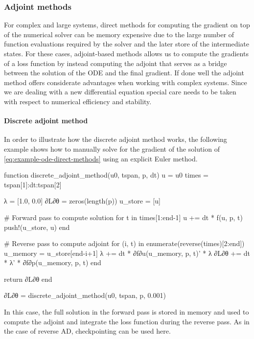 \subsubsection{Adjoint methods}
\label{section:computing-adjoints}

For complex and large systems, direct methods for computing the gradient on top of the numerical solver can be memory expensive due to the large number of function evaluations required by the solver and the later store of the intermediate states. 
For these cases, adjoint-based methods allows us to compute the gradients of a loss function by instead computing the adjoint that serves as a bridge between the solution of the ODE and the final gradient. 
If done well the adjoint method offers considerate advantages when working with complex systems.
Since we are dealing with a new differential equation special care needs to be taken with respect to numerical efficiency and stability.

\paragraph{Discrete adjoint method}

In order to illustrate how the discrete adjoint method works, the following example shows how to manually solve for the gradient of the solution of \eqref{eq:example-ode-direct-methods} using an explicit Euler method. 
\begin{jllisting}
function discrete_adjoint_method(u0, tspan, p, dt)
    u = u0
    times = tspan[1]:dt:tspan[2]

    λ = [1.0, 0.0]
    ∂L∂θ = zeros(length(p))
    u_store = [u]

    # Forward pass to compute solution
    for t in times[1:end-1]
        u += dt * f(u, p, t)
        push!(u_store, u)
    end

    # Reverse pass to compute adjoint
    for (i, t) in enumerate(reverse(times)[2:end])
        u_memory = u_store[end-i+1]
        λ += dt * ∂f∂u(u_memory, p, t)' * λ
        ∂L∂θ += dt * λ' * ∂f∂p(u_memory, p, t)
    end

    return ∂L∂θ
end

∂L∂θ = discrete_adjoint_method(u0, tspan, p, 0.001) 
\end{jllisting}
In this case, the full solution in the forward pass is stored in memory and used to compute the adjoint and integrate the loss function during the reverse pass. 
As in the case of reverse AD, checkpointing can be used here. 

